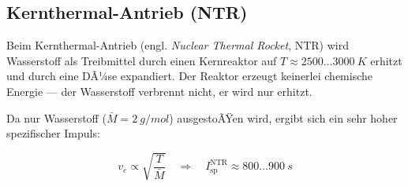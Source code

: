 ﻿\documentclass[12pt,a4paper]{article}
\newcommand{\Isp}{I_{\mathrm{sp}}}
\begin{document}
\subsection{Kernthermal-Antrieb (NTR)}

Beim Kernthermal-Antrieb (engl. \emph{Nuclear Thermal Rocket}, NTR) wird Wasserstoff
als Treibmittel durch einen Kernreaktor auf $T \approx 2500\ldots\SI{3000}{K}$ erhitzt
und durch eine DÃ¼se expandiert. Der Reaktor erzeugt keinerlei chemische Energie ---
der Wasserstoff verbrennt nicht, er wird nur erhitzt.

Da nur Wasserstoff ($\bar{M} = \SI{2}{g/mol}$) ausgestoÃŸen wird, ergibt sich ein
sehr hoher spezifischer Impuls:

\[
  v_e \propto \sqrt{\frac{T}{\bar{M}}}
  \quad\Rightarrow\quad
  \Isp^{\mathrm{NTR}} \approx 800\ldots\SI{900}{s}
\]
\end{document}
